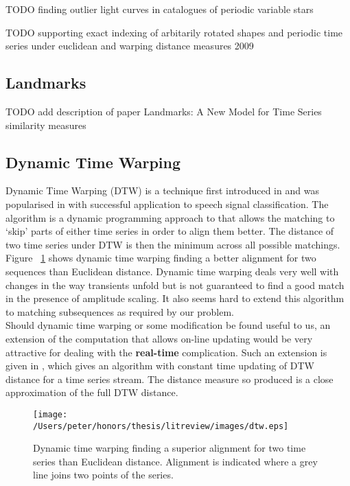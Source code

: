 	TODO finding outlier light curves in catalogues of periodic variable stars
	
	TODO supporting exact indexing of arbitarily rotated shapes and periodic time series under euclidean and warping distance measures 2009
	\subsection{Landmarks}
	TODO add description of paper Landmarks: A New Model for Time Series similarity measures
	
	\subsection{Dynamic Time Warping}
	Dynamic Time Warping (DTW) is a technique first introduced in \citep{sakoe1978dynamic} and was popularised in \citep{berndt1994using} with successful application to speech signal classification. The algorithm is a dynamic programming approach to that allows the matching to `skip' parts of either time series in order to align them better. The distance of two time series under DTW is then the minimum across all possible matchings. Figure ~\ref{fig:dtwinaction} shows dynamic time warping finding a better alignment for two sequences than Euclidean distance. Dynamic time warping deals very well with changes in the way transients unfold but is not guaranteed to find a good match in the presence of amplitude scaling. It also seems hard to extend this algorithm to matching subsequences as required by our problem.
	\\
	Should dynamic time warping or some modification be found useful to us, an extension of the computation that allows on-line updating would be very attractive for dealing with the \textbf{real-time} complication. Such an extension is given in \citep{capitani2007warping}, which gives an algorithm with constant time updating of DTW distance for a time series stream. The distance measure so produced is a close approximation of the full DTW distance.
	
	\begin{figure}[h!]
			\label{fig:dtwinaction}
	\centering
	\texttt{[image: /Users/peter/honors/thesis/litreview/images/dtw.eps]}
	\caption{Dynamic time warping finding a superior alignment for two time series than Euclidean distance. Alignment is indicated where a grey line joins two points of the series.}
	\end{figure}

